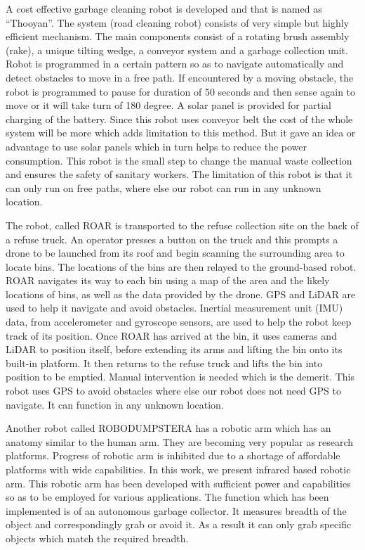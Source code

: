 \documentclass[conference]{IEEEtran}
\begin{document}
	A cost effective garbage cleaning robot is developed and that is named as “Thooyan”\cite{b1}. The system (road cleaning robot) consists of very simple but highly efficient mechanism. The main components consist of a rotating brush assembly (rake), a unique tilting wedge, a conveyor system and a garbage collection unit. Robot is programmed in a certain pattern so as to navigate automatically and detect obstacles to move in a free path. If encountered by a moving obstacle, the robot is programmed to pause for duration of 50 seconds and then sense again to move or it will take turn of 180 degree. A solar panel is provided for partial charging of the battery. Since this robot uses conveyor belt the cost of the whole system will be more which adds limitation to this method. But it gave an idea or advantage to use solar panels which in turn helps to reduce the power consumption. This robot is the small step to change the manual waste collection and ensures the safety of sanitary workers. The limitation of this robot is that it can only run on free paths, where else our robot can run in any unknown location.
	
	The robot, called ROAR\cite{b2} is transported to the refuse collection site on the back of a refuse truck. An operator presses a button on the truck and this prompts a drone to be launched from its roof and begin scanning the surrounding area to locate bins. The locations of the bins are then relayed to the ground-based robot. ROAR navigates its way to each bin using a map of the area and the likely locations of bins, as well as the data provided by the drone. GPS and LiDAR are used to help it navigate and avoid obstacles. Inertial measurement unit (IMU) data, from accelerometer and gyroscope sensors, are used to help the robot keep track of its position. Once ROAR has arrived at the bin, it uses cameras and LiDAR to position itself, before extending its arms and lifting the bin onto its built-in platform. It then returns to the refuse truck and lifts the bin into position to be emptied. Manual intervention is needed which is the demerit. This robot uses GPS to avoid obstacles where else our robot does not need GPS to navigate. It can function in any unknown location.
	
	Another robot called ROBODUMPSTERA \cite{b3} has a robotic arm which has an anatomy similar to the human arm. They are becoming very popular as research platforms. Progress of robotic arm is inhibited due to a shortage of affordable platforms with wide capabilities. In this work, we present infrared based robotic arm. This robotic arm has been developed with sufficient
	power and capabilities so as to be employed for various applications. The function which has
	been implemented is of an autonomous garbage collector. It measures breadth of the object
	and correspondingly grab or avoid it. As a result it can only grab specific objects which match the required breadth.
	
\end{document}
